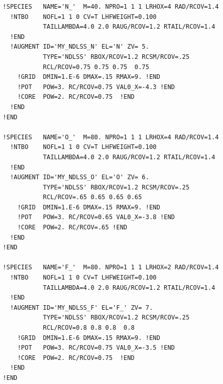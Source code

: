 \documentclass[11pt,a4paper]{report}
\begin{document}
\begin{verbatim}
  !SPECIES   NAME='N_'  M=40. NPRO=1 1 1 LRHOX=4 RAD/RCOV=1.4
    !NTBO    NOFL=1 1 0 CV=T LHFWEIGHT=0.100
             TAILLAMBDA=4.0 2.0 RAUG/RCOV=1.2 RTAIL/RCOV=1.4 
    !END 
    !AUGMENT ID='MY_NDLSS_N' EL='N' ZV= 5.
             TYPE='NDLSS' RBOX/RCOV=1.2 RCSM/RCOV=.25
             RCL/RCOV=0.75 0.75 0.75  0.75
      !GRID  DMIN=1.E-6 DMAX=.15 RMAX=9. !END
      !POT   POW=3. RC/RCOV=0.75 VAL0_X=-4.3 !END
      !CORE  POW=2. RC/RCOV=0.75  !END
    !END
  !END

  !SPECIES   NAME='O_'  M=80. NPRO=1 1 1 LRHOX=4 RAD/RCOV=1.4
    !NTBO    NOFL=1 1 0 CV=T LHFWEIGHT=0.100
             TAILLAMBDA=4.0 2.0 RAUG/RCOV=1.2 RTAIL/RCOV=1.4 
    !END 
    !AUGMENT ID='MY_NDLSS_O' EL='O' ZV= 6.
             TYPE='NDLSS' RBOX/RCOV=1.2 RCSM/RCOV=.25
             RCL/RCOV=.65 0.65 0.65 0.65
      !GRID  DMIN=1.E-6 DMAX=.15 RMAX=9. !END
      !POT   POW=3. RC/RCOV=0.65 VAL0_X=-3.8 !END
      !CORE  POW=2. RC/RCOV=.65 !END
    !END
  !END

  !SPECIES   NAME='F_'  M=80. NPRO=1 1 1 LRHOX=2 RAD/RCOV=1.4
    !NTBO    NOFL=1 1 0 CV=T LHFWEIGHT=0.100
             TAILLAMBDA=4.0 2.0 RAUG/RCOV=1.2 RTAIL/RCOV=1.4 
    !END 
    !AUGMENT ID='MY_NDLSS_F' EL='F_' ZV= 7.
             TYPE='NDLSS' RBOX/RCOV=1.2 RCSM/RCOV=.25
             RCL/RCOV=0.8 0.8 0.8  0.8 
      !GRID  DMIN=1.E-6 DMAX=.15 RMAX=9. !END
      !POT   POW=3. RC/RCOV=0.75 VAL0_X=-3.5 !END
      !CORE  POW=2. RC/RCOV=0.75  !END
    !END
  !END
\end{verbatim}
\end{document}
